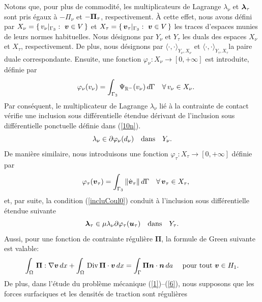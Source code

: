 Notons que, pour plus de commodité, les multiplicateurs de Lagrange $\lambda_{\nu}$ et $\mbox{\boldmath{$\lambda$}}_{\tau}$ sont pris égaux à $-\Pi_{\nu}$ et $-\mbox{\boldmath{$\Pi$}}_{\tau}$, respectivement. À cette effet, nous avons défini par
$X_\nu=\left\{\,v_\nu|_{\Gamma_3} : \ \mbox{\boldmath{$v$}} \in V\, \right\}$ et
$X_\tau=\left\{\,\mbox{\boldmath{$v$}}_\tau|_{\Gamma_3} : \ \mbox{\boldmath{$v$}} \in V\, \right\}$
les traces d'espaces munies de leurs normes habituelles. Nous désignons par $Y_\nu$ et $Y_\tau$ les duals des espaces $X_\nu$ et $X_\tau$, respectivement. De plus, nous désignons par
$\langle\cdot,\cdot\rangle_{Y_{\nu},X_{\nu}}$ et $\langle\cdot,\cdot\rangle_{Y_{\tau},X_{\tau}}$la paire duale correspondante. Ensuite, une fonction $\varphi_\nu :
X_\nu\to[0,+\infty]$ est introduite, définie par
\begin{eqnarray*}
&&\varphi_\nu(v_\nu) = \int_{\Gamma_3} \Psi_{\mathbb{R}^-}(v_\nu)\,d\Gamma
\quad \forall\, v_\nu \in X_\nu.
\end{eqnarray*}
Par conséquent, le multiplicateur de Lagrange $\lambda_{\nu}$ lié à la contrainte de contact vérifie une inclusion sous différentielle étendue dérivant de l'inclusion sous différentielle ponctuelle définie dans (\ref{10n}).
\begin{equation}
\label{signsub} \lambda_\nu \in
\partial\varphi_\nu(d_{\nu}) \quad {\rm
dans}\quad Y_{\nu}.
\end{equation}
De manière similaire, nous introduisons une fonction $\varphi_\tau:X_{\tau}\to[0,+\infty]$ définie par
\begin{eqnarray*}
&&\varphi_\tau(\mbox{\boldmath{$v$}}_\tau) = \int_{\Gamma_3}\|{\dot{\mbox{\boldmath{$v$}}}}_{\tau}\|\,d\Gamma
\quad \forall\, \mbox{\boldmath{$v$}}_\tau \in X_\tau,
\end{eqnarray*}
et, par suite, la condition (\ref{incluCoul0}) conduit à l'inclusion sous différentielle étendue suivante
\begin{equation}\label{incluCoul}
\mbox{\boldmath{$\lambda$}}_{\tau}\in \mu\lambda_{\nu}\partial\varphi_\tau({\mbox{\boldmath{$u$}}}_{\tau}) \quad {\rm
dans}\quad Y_{\tau}.
\end{equation}
Aussi, pour une fonction de contrainte régulière $\boldsymbol{\Pi}$, la formule de Green suivante est valable:
\begin{equation}
\int_\Omega\,\boldsymbol{\Pi}:\nabla\mbox{\boldmath{$v$}}\,dx+\int_\Omega\,{\rm
Div}\,\boldsymbol{\Pi}\cdot\mbox{\boldmath{$v$}}\,dx = \int_\Gamma\boldsymbol{\Pi}\mbox{\boldmath{$n$}} \cdot\mbox{\boldmath{$n$}}\,da
\quad {\rm\ pour\ tout }\ \mbox{\boldmath{$v$}}\in H_1. \label{Green}
\end{equation}
\noindent De plus, dans l'étude du problème mécanique (\ref{1})--(\ref{6}), nous supposons que les forces surfaciques et les densités de traction sont régulières
